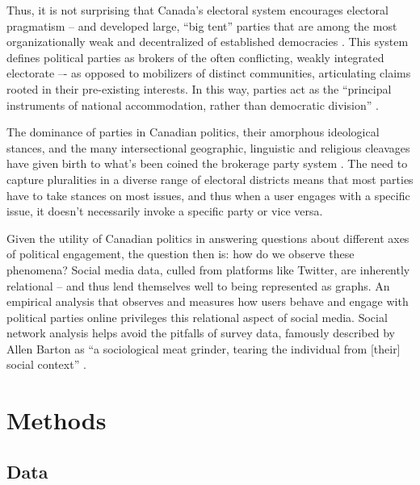 \documentclass{nws}
\begin{document}
Thus, it is not surprising that Canada’s electoral system
encourages electoral pragmatism – and developed large, “big tent” parties that
are among the most organizationally weak and decentralized of established
democracies \cite{carty2010political}. This system defines political parties as brokers of the often
conflicting, weakly integrated electorate –- as opposed to mobilizers of
distinct communities, articulating claims rooted in their pre-existing
interests. In this way, parties act as the ``principal instruments of national
accommodation, rather than democratic division'' \cite{carty2010political}.

The dominance of parties in Canadian politics, their amorphous ideological
stances, and the many intersectional geographic, linguistic and religious
cleavages have given birth to what’s been coined the brokerage party system
\cite{carty2010political}. The need to capture pluralities in a diverse range of
electoral districts means that most parties have to take stances on most issues,
and thus when a user engages with a specific issue, it doesn’t necessarily
invoke a specific party or vice versa. 

Given the utility of Canadian politics in answering questions about different
axes of political engagement, the question then is: how do we observe these
phenomena? Social media data, culled from platforms like Twitter, are inherently
relational -- and thus lend themselves well to being represented as graphs. An
empirical analysis that observes and measures how users behave and engage with
political parties online privileges this relational aspect of social media.
Social network analysis helps avoid the pitfalls of survey data, famously
described by Allen Barton as “a sociological meat grinder, tearing the
individual from [their] social context” \cite{freeman2004development}.  


\section{Methods}

\subsection{Data}
\end{document}
